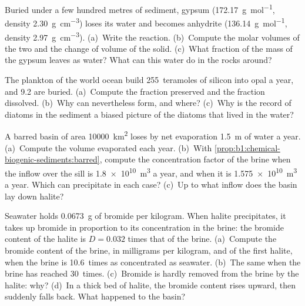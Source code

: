 \begin{exercise}[$\star\star$]\label{exo:b1:chemical-biogenic-sediments:8}
Buried under a few hundred metres of sediment, gypsum 
(\qty{172.17}{g.mol^{-1}}, density \qty{2.30}{g.cm^{-3}}) loses its water and
becomes anhydrite  (\qty{136.14}{g.mol^{-1}}, density
\qty{2.97}{g.cm^{-3}}). (a)~Write the reaction. (b)~Compute the molar volumes of
the two  and the change of volume of the solid. (c)~What fraction of
the mass of the gypsum leaves as water? What can this water do in the rocks
around?
\end{exercise}

\begin{exercise}[$\star\star$]\label{exo:b1:chemical-biogenic-sediments:9}
The plankton of the world ocean build 255~teramoles of silicon into opal a
year, and 9.2 are buried. (a)~Compute the fraction preserved and the fraction
dissolved. (b)~Why can  nevertheless form, and where? (c)~Why
is the record of diatoms in the sediment a biased picture of the diatoms that
lived in the water?
\end{exercise}

\begin{exercise}[$\star\star\star$]\label{exo:b1:chemical-biogenic-sediments:10}
A barred basin of area \qty{10000}{km^2} loses by net evaporation \qty{1.5}{m}
of water a year. (a)~Compute the volume evaporated each year. (b)~With
\cref{prop:b1:chemical-biogenic-sediments:barred}, compute the concentration
factor of the brine when the inflow over the sill is \qty{1.8e10}{m^3} a year,
and when it is \qty{1.575e10}{m^3} a year. Which  can precipitate in
each case? (c)~Up to what inflow does the basin lay down halite?
\end{exercise}

\begin{exercise}[$\star\star\star$]\label{exo:b1:chemical-biogenic-sediments:11}
Seawater holds \qty{0.0673}{g} of bromide per kilogram. When halite
precipitates, it takes up bromide in proportion to its concentration in the
brine: the bromide content of the halite is $D = 0.032$ times that of the
brine. (a)~Compute the bromide content of the brine, in milligrams per
kilogram, and of the first halite, when the brine is 10.6~times as concentrated
as seawater. (b)~The same when the brine has reached 30~times. (c)~Bromide is
hardly removed from the brine by the halite: why? (d)~In a thick bed of halite,
the bromide content rises upward, then suddenly falls back. What happened to
the basin?
\end{exercise}

